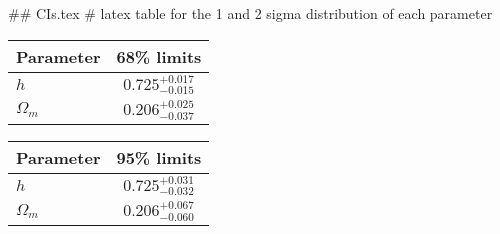 ## CIs.tex
# latex table for the 1 and 2 sigma distribution of each parameter

\begin{tabular} { l  c}
 Parameter &  68\% limits\\
\hline
{\boldmath$h              $} & $0.725^{+0.017}_{-0.015}   $\\
{\boldmath$\Omega_m       $} & $0.206^{+0.025}_{-0.037}   $\\
\hline
\end{tabular}

\begin{tabular} { l  c}
 Parameter &  95\% limits\\
\hline
{\boldmath$h              $} & $0.725^{+0.031}_{-0.032}   $\\
{\boldmath$\Omega_m       $} & $0.206^{+0.067}_{-0.060}   $\\
\hline
\end{tabular}
